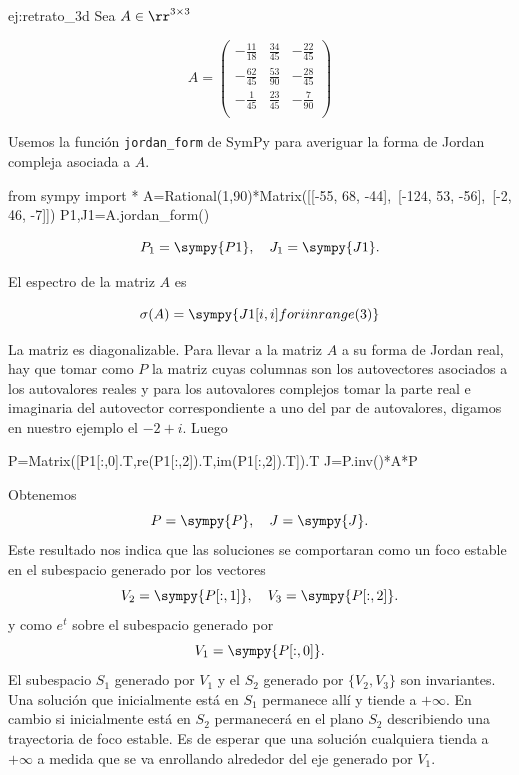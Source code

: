 \begin{ejemplo}{ej:retrato_3d} Sea $A\in\rr^{3\times 3}$

\[A=
\begin{pmatrix}- \frac{11}{18} & \frac{34}{45} & - \frac{22}{45}\\- \frac{62}{45} & \frac{53}{90} & - \frac{28}{45}\\- \frac{1}{45} & \frac{23}{45} & - \frac{7}{90}\\
\end{pmatrix}
\]

Usemos la función \texttt{jordan\_form} de SymPy para averiguar la forma de Jordan compleja asociada a $A$.
\begin{sympyblock}[][numbers=left,frame=single,framesep=5mm]
from sympy import *
A=Rational(1,90)*Matrix([[-55, 68, -44],\
    [-124, 53, -56],\
    [-2, 46, -7]])
P1,J1=A.jordan_form()
\end{sympyblock}

\[
 P_1=\sympy{P1},\quad J_1=\sympy{J1}.
\]

El espectro de la matriz $A$ es 

$$\sigma(A)=\sympy{ {J1[i,i] for i in range(3)} }$$

La matriz es diagonalizable. Para llevar a la matriz $A$ a su forma de Jordan real, hay que tomar como $P$ la matriz cuyas columnas son los autovectores asociados a los autovalores reales y para los autovalores complejos tomar la parte real e imaginaria del autovector correspondiente a uno del par de autovalores, digamos en nuestro ejemplo el $-2+i$. Luego

\begin{sympyblock}[][numbers=left,frame=single,framesep=5mm]
P=Matrix([P1[:,0].T,re(P1[:,2]).T,im(P1[:,2]).T]).T
J=P.inv()*A*P
\end{sympyblock}
Obtenemos
\[
 P=\sympy{P},\quad J=\sympy{J}. 
\]
Este resultado nos indica que las soluciones se comportaran como un foco estable en el subespacio generado por los vectores
\[
 V_2=\sympy{P[:,1]}, \quad V_3=\sympy{P[:,2]}.
\]
y como $e^t$ sobre el subespacio generado por 
\[
 V_1=\sympy{P[:,0]}.
\]
 El subespacio $S_1$ generado por $V_1$ y el $S_2$ generado por $\{V_2,V_3\}$ son invariantes. Una solución que inicialmente está en $S_1$ permanece allí y tiende a $+\infty$. En cambio si inicialmente está en $S_2$ permanecerá en el plano $S_2$ describiendo una trayectoria de foco estable.  Es de esperar que una solución cualquiera tienda a $+\infty$ a medida que se va enrollando alrededor del eje generado por $V_1$.


\end{ejemplo}
